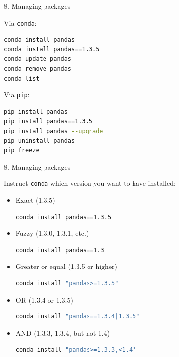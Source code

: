 
\begin{vbframe}{8. Managing packages}

\vfill

Via \texttt{conda}:

\begin{lstlisting}[language=bash]
conda install pandas
conda install pandas==1.3.5
conda update pandas
conda remove pandas
conda list
\end{lstlisting}

Via \texttt{pip}:

\begin{lstlisting}[language=bash]
pip install pandas
pip install pandas==1.3.5
pip install pandas --upgrade
pip uninstall pandas
pip freeze
\end{lstlisting}

\vfill

\end{vbframe}


\begin{vbframe}{8. Managing packages}

\vfill

Instruct \texttt{conda} which version you want to have installed:

\begin{itemize}
	\item Exact (1.3.5)
\begin{lstlisting}[language=bash]
conda install pandas==1.3.5
\end{lstlisting}
	\item Fuzzy (1.3.0, 1.3.1, etc.)
\begin{lstlisting}[language=bash]
conda install pandas==1.3
\end{lstlisting}
	\item Greater or equal (1.3.5 or higher)
\begin{lstlisting}[language=bash]
conda install "pandas>=1.3.5"
\end{lstlisting}
	\item OR (1.3.4 or 1.3.5)
\begin{lstlisting}[language=bash]
conda install "pandas==1.3.4|1.3.5"
\end{lstlisting}
	\item AND (1.3.3, 1.3.4, but not 1.4)
\begin{lstlisting}[language=bash]
conda install "pandas>=1.3.3,<1.4"
\end{lstlisting}

\end{itemize}

\vfill

\end{vbframe}

